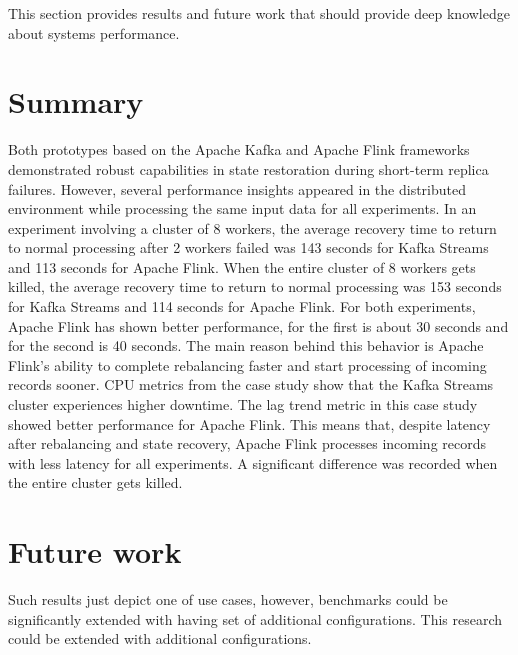 This section provides results and future work that should provide deep knowledge
about systems performance.


\section{Summary}\label{sec:recap-of-the-research}
Both prototypes based on the Apache Kafka and Apache Flink frameworks demonstrated robust capabilities in state restoration
during short-term replica failures.
However, several performance insights appeared in the distributed environment
while processing the same input data for all experiments.
In an experiment involving a cluster of 8 workers, the average recovery time to return to normal processing
after 2 workers failed was 143 seconds for Kafka Streams and 113 seconds for Apache Flink.
When the entire cluster of 8 workers gets killed, the average recovery time to return to
normal processing was 153 seconds for Kafka Streams and 114 seconds for Apache Flink.
For both experiments, Apache Flink has shown better performance, for the first is about 30 seconds
and for the second is 40 seconds.
The main reason behind this behavior is Apache Flink's ability to complete rebalancing faster and start processing of
incoming records sooner.
CPU metrics from the case study show that the Kafka Streams cluster experiences higher downtime.
The lag trend metric in this case study showed better performance for Apache Flink.
This means that, despite latency after rebalancing and state recovery,
Apache Flink processes incoming records with less latency for all experiments.
A significant difference was recorded when the entire cluster gets killed.


\section{Future work}\label{sec:future-work}
Such results just depict one of use cases, however, benchmarks could be significantly
extended with having set of additional configurations.
This research could be extended with additional configurations.

